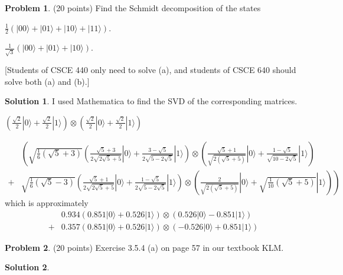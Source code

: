 \documentclass{article}
\theoremstyle{definition}
\newtheorem{problem}{Problem}
\newtheorem*{solution}{Solution}
\newcommand{\ket}[1]{|#1\rangle}
\begin{document}
\begin{problem}{(20 points)}
Find the Schmidt decomposition of the states 
\begin{compactenum}[(a)]
\item $ \frac{1}{2}\left( \ket{00} + \ket{01} + \ket{10} + \ket{11}
  \right)$.
\item $ \frac{1}{\sqrt{3}}\left( \ket{00} + \ket{01} + \ket{10}
  \right)$.
\end{compactenum}
[Students of CSCE 440 only need to solve (a), and students of CSCE 640
should solve both (a) and (b).] 
\end{problem}
\begin{solution}
I used Mathematica to find the SVD of the corresponding matrices.
\begin{compactenum}[(a)]
\item 
$(\frac{\sqrt{2}}{2} \ket{0} + \frac{\sqrt{2}}{2} \ket{1}) \otimes (\frac{\sqrt{2}}{2} \ket{0} + \frac{\sqrt{2}}{2} \ket{1})$
\item 
\begin{align*}
& \left( \sqrt{\frac{1}{6} \left(\sqrt{5}+3\right)} (\frac{\sqrt{5}+3}{2 \sqrt{2 \sqrt{5}+5}} \ket{0} + \frac{3-\sqrt{5}}{2 \sqrt{5-2 \sqrt{5}}} \ket{1}) 
       \otimes (\frac{\sqrt{5}+1}{\sqrt{2 \left(\sqrt{5}+5\right)}}\ket{0} + \frac{1-\sqrt{5}}{\sqrt{10-2 \sqrt{5}}} \ket{1}) \right.
\\ +  & \left. \sqrt{\frac{1}{6} \left(\sqrt{5}-3\right)} (\frac{\sqrt{5}+1}{2 \sqrt{2 \sqrt{5}+5}} \ket{0} + \frac{1-\sqrt{5}}{2 \sqrt{5-2 \sqrt{5}}} \ket{1}) 
       \otimes (\frac{2}{\sqrt{2 \left(\sqrt{5}+5\right)}}\ket{0} + \sqrt{\frac{1}{10} \left(\sqrt{5}+5\right)} \ket{1})  \right)
\end{align*}
which is approximately
\begin{align*}
& 0.934(0.851 \ket{0} + 0.526 \ket{1}) \otimes (0.526 \ket{0} -0.851 \ket{1})
\\ + &  0.357(0.851 \ket{0} + 0.526 \ket{1}) \otimes (-0.526 \ket{0} + 0.851 \ket{1})
\end{align*}
\end{compactenum}
\end{solution}

\begin{problem}{(20 points)}
Exercise 3.5.4 (a) on page 57 in our textbook KLM. 
\end{problem}
\begin{solution}
\end{solution}
\end{document}
